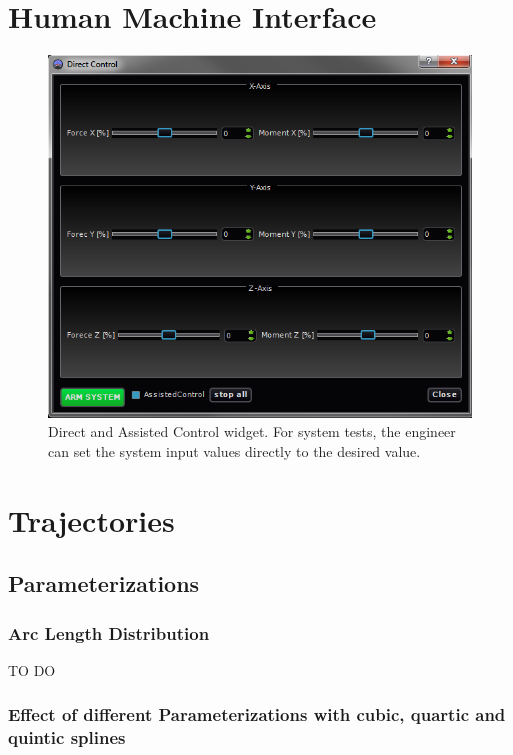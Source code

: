 
\chapter{Human Machine Interface}
\label{cha:appendix_HMI}
\begin{figure}[H]
    \includegraphics[width = \textwidth]{graphics/HMI/qgc_manual_control_widget.png}
  \caption{Direct and Assisted Control widget. For system tests, the engineer can set the system input values directly to the desired value.}
  \label{fig:parameterization_cqq}
\end{figure}

\chapter{Trajectories}
\label{cha:appendix}

\section{Parameterizations}
\subsection{Arc Length Distribution}
\label{subsec:arcLengthDistribution}
TO DO
\subsection{Effect of different Parameterizations with cubic, quartic and quintic splines}
\label{subsec:parameterization_degree}

